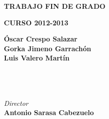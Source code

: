 \begin{frontmatter}

\thispagestyle{empty}


\vfill


  \begin{center}
				{}
  \end{center}

\vfill

\begin{center}
  {\Large {\bf TRABAJO FIN DE GRADO}}
\end{center}

\begin{center}
  {\Large {\bf CURSO 2012-2013}}
\end{center}

\vfill


\begin{large}
\begin{center}
\begin{large}
  	{\bf \'Oscar Crespo Salazar}\\
	{\bf Gorka Jimeno Garrach\'on}\\
	{\bf Luis Valero Mart\'in}
\end{large}
  \\ \mbox{ } \\ \mbox{ } \\ 
{\it Director}  \\ [0.3em]
  {\bf  Antonio Sarasa Cabezuelo}
  \vspace{.5ex}
\begin{large}
\begin{center}
\vspace{3ex}
\\[0.2em]
\\[0.2em]
\\[1em]
\end{center}
\end{large}
\end{center}


\end{large}
\end{frontmatter}
